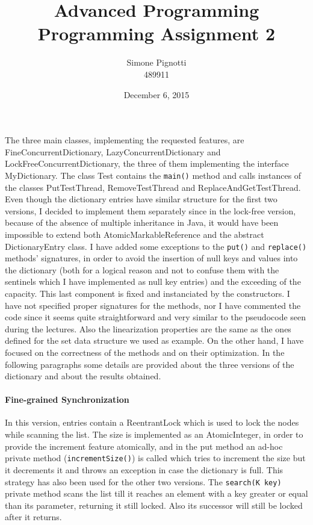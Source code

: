\documentclass[a4paper]{article}
\title{Advanced Programming\\Programming Assignment 2}
\author{Simone Pignotti  \\
	489911  \\
	}
\date{December 6, 2015}
\begin{document}
\maketitle

The three main classes, implementing the requested features, are FineConcurrentDictionary, LazyConcurrentDictionary and LockFreeConcurrentDictionary, the three of them implementing the interface MyDictionary. The class Test contains the \texttt{main()} method and calls instances of the classes PutTestThread, RemoveTestThread and ReplaceAndGetTestThread. Even though the dictionary entries have similar structure for the first two versions, I decided to implement them separately since in the lock-free version, because of the absence of multiple inheritance in Java, it would have been impossible to extend both AtomicMarkableReference and the abstract DictionaryEntry class. I have added some exceptions to the \texttt{put()} and \texttt{replace()} methods' signatures, in order to avoid the insertion of null keys and values into the dictionary (both for a logical reason and not to confuse them with the sentinels which I have implemented as null key entries) and the exceeding of the capacity. This last component is fixed and instanciated by the constructors. I have not specified proper signatures for the methods, nor I have commented the code since it seems quite straightforward and very similar to the pseudocode seen during the lectures. Also the linearization properties are the same as the ones defined for the set data structure we used as example. On the other hand, I have focused on the correctness of the methods and on their optimization. In the following paragraphs some details are provided about the three versions of the dictionary and about the results obtained.

\paragraph{Fine-grained Synchronization}
In this version, entries contain a ReentrantLock which is used to lock the nodes while scanning the list. The size is implemented as an AtomicInteger, in order to provide the increment feature atomically, and in the put method an ad-hoc private method (\texttt{incrementSize()}) is called which tries to increment the size but it decrements it and throws an exception in case the dictionary is full. This strategy has also been used for the other two versions. The \texttt{search(K key)} private method scans the list till it reaches an element with a key greater or equal than its parameter, returning it still locked. Also its successor will still be locked after it returns.
\end{document}
